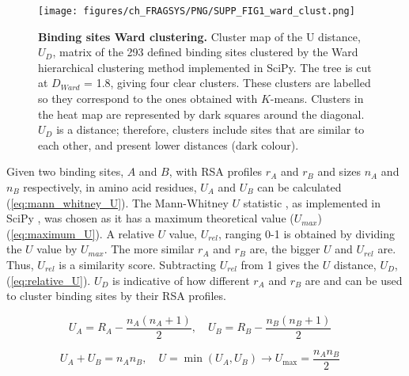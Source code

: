\begin{figure}[htb!]
    \centering
    \texttt{[image: figures/ch\_FRAGSYS/PNG/SUPP\_FIG1\_ward\_clust.png]}
    \caption[Binding sites Ward clustering]{\textbf{Binding sites Ward clustering.} Cluster map of the U distance, $U_{D}$, matrix of the 293 defined binding sites clustered by the Ward hierarchical clustering method implemented in SciPy. The tree is cut at $D_{Ward}$ = 1.8, giving four clear clusters. These clusters are labelled so they correspond to the ones obtained with $K$-means. Clusters in the heat map are represented by dark squares around the diagonal. $U_{D}$ is a distance; therefore, clusters include sites that are similar to each other, and present lower distances (dark colour).}
    \label{fig:fragsys_bs_clust_ward}
\end{figure}

Given two binding sites, $A$ and $B$, with RSA profiles $r_{A}$ and $r_{B}$ and sizes $n_{A}$ and $n_{B}$ respectively, in amino acid residues, $U_{A}$ and $U_{B}$ can be calculated (\autoref{eq:mann_whitney_U}). The Mann-Whitney $U$ statistic \cite{MANN_WHITNEY_1947_TEST}, as implemented in SciPy \cite{VIRTANEN_2020_SCIPY}, was chosen as it has a maximum theoretical value ($U_{max}$) (\autoref{eq:maximum_U}). A relative $U$ value, $U_{rel}$, ranging 0-1 is obtained by dividing the $U$ value by $U_{max}$. The more similar $r_{A}$ and $r_{B}$ are, the bigger $U$ and $U_{rel}$ are. Thus, $U_{rel}$ is a similarity score. Subtracting $U_{rel}$ from 1 gives the $U$ distance, $U_{D}$, (\autoref{eq:relative_U}). $U_{D}$ is indicative of how different $r_{A}$ and $r_{B}$ are and can be used to cluster binding sites by their RSA profiles.

\begin{equation}
U_A = R_A - \frac{n_A(n_A + 1)}{2}, \quad U_B = R_B - \frac{n_B(n_B + 1)}{2} \quad
\label{eq:mann_whitney_U}
\end{equation}

\vspace{-31pt} %

\begin{equation}
U_A + U_B = n_A n_B, \quad U = \min(U_A, U_B) \rightarrow U_{\max} = \frac{n_A n_B}{2} \quad
\label{eq:maximum_U} 
\end{equation}

\vspace{-31pt} %

